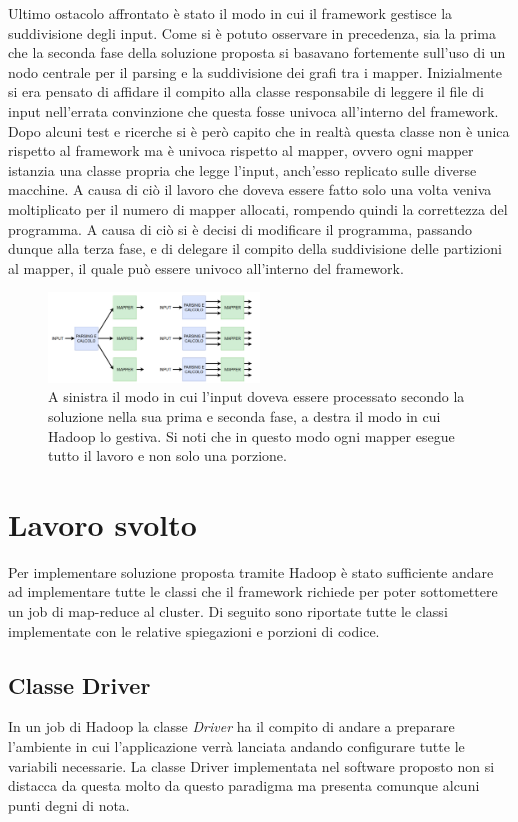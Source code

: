 \documentclass[]{IEEEtran}
\begin{document}
Ultimo ostacolo affrontato è stato il modo in cui il framework gestisce la suddivisione degli input. Come si è potuto osservare in precedenza, sia la prima che la seconda fase della soluzione proposta si basavano fortemente sull'uso di un nodo centrale per il parsing e la suddivisione dei grafi tra i mapper. Inizialmente si era pensato di affidare il compito alla classe responsabile di leggere il file di input nell'errata convinzione che questa fosse univoca all'interno del framework. Dopo alcuni test e ricerche si è però capito che in realtà questa classe non è unica rispetto al framework ma è univoca rispetto al mapper, ovvero ogni mapper istanzia una classe propria che legge l'input, anch'esso replicato sulle diverse macchine. A causa di ciò il lavoro che doveva essere fatto solo una volta veniva moltiplicato per il numero di mapper allocati, rompendo quindi la correttezza del programma. A causa di ciò si è decisi di modificare il programma, passando dunque alla terza fase, e di delegare il compito della suddivisione delle partizioni al mapper, il quale può essere univoco all'interno del framework.
\begin{figure}
	\includegraphics[width=0.5\textwidth]{images/hadoop_input.png}
	\caption{A sinistra il modo in cui l'input doveva essere processato secondo la soluzione nella sua prima e seconda fase, a destra il modo in cui Hadoop lo gestiva. Si noti che in questo modo ogni mapper esegue tutto il lavoro e non solo una porzione.}
\end{figure}

\section{Lavoro svolto} \label{work}
Per implementare soluzione proposta tramite Hadoop è stato sufficiente andare ad implementare tutte le classi che il framework richiede per poter sottomettere un job  di map-reduce al cluster. Di seguito sono riportate tutte le classi implementate con le relative spiegazioni e porzioni di codice.
\subsection{Classe Driver}
In un job di Hadoop la classe \emph{Driver} ha il compito di andare a preparare  l'ambiente in cui l'applicazione verrà lanciata andando configurare tutte le variabili necessarie. La classe Driver implementata nel software proposto non si distacca da questa molto da questo paradigma ma presenta comunque alcuni punti degni di nota.
\end{document}
